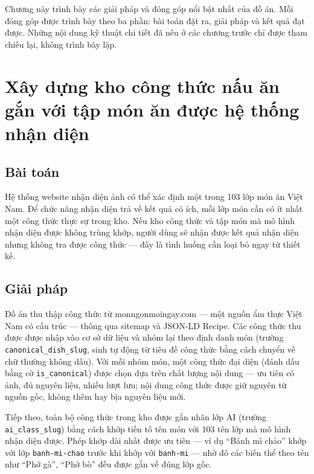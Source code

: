 \documentclass[../DoAn.tex]{subfiles}
\begin{document}
Chương này trình bày các giải pháp và đóng góp nổi bật nhất của đồ án. Mỗi đóng góp được trình bày theo ba phần: bài toán đặt ra, giải pháp và kết quả đạt được. Những nội dung kỹ thuật chi tiết đã nêu ở các chương trước chỉ được tham chiếu lại, không trình bày lặp.

\section{Xây dựng kho công thức nấu ăn gắn với tập món ăn được hệ thống nhận diện}
\label{sec:5-chuanhoa}

\subsection*{Bài toán}
Hệ thống website nhận diện ảnh có thể xác định một trong 103 lớp món ăn Việt Nam. Để chức năng nhận diện trả về kết quả có ích, mỗi lớp món cần có ít nhất một công thức thực sự trong kho. Nếu kho công thức và tập món mà mô hình nhận diện được không trùng khớp, người dùng sẽ nhận được kết quả nhận diện nhưng không tra được công thức --- đây là tình huống cần loại bỏ ngay từ thiết kế.

\subsection*{Giải pháp}
Đồ án thu thập công thức từ monngonmoingay.com --- một nguồn ẩm thực Việt Nam có cấu trúc --- thông qua sitemap và JSON-LD Recipe. Các công thức thu được được nhập vào cơ sở dữ liệu và nhóm lại theo định danh món (trường \texttt{canonical\_dish\_slug}, sinh tự động từ tiêu đề công thức bằng cách chuyển về chữ thường không dấu). Với mỗi nhóm món, một công thức đại diện (đánh dấu bằng cờ \texttt{is\_canonical}) được chọn dựa trên chất lượng nội dung --- ưu tiên có ảnh, đủ nguyên liệu, nhiều lượt lưu; nội dung công thức được giữ nguyên từ nguồn gốc, không thêm hay bịa nguyên liệu mới.

Tiếp theo, toàn bộ công thức trong kho được gắn nhãn lớp AI (trường \texttt{ai\_class\_slug}) bằng cách khớp tiền tố tên món với 103 tên lớp mà mô hình nhận diện được. Phép khớp dài nhất được ưu tiên --- ví dụ ``Bánh mì chảo'' khớp với lớp \texttt{banh-mi-chao} trước khi khớp với \texttt{banh-mi} --- nhờ đó các biến thể theo tên như ``Phở gà'', ``Phở bò'' đều được gắn về đúng lớp gốc.
\end{document}

